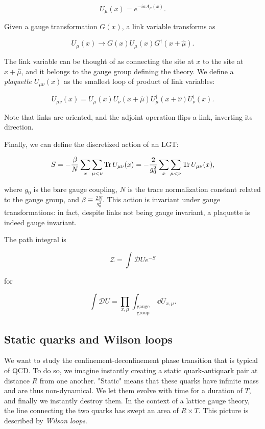 \documentclass[reqno,12pt]{article}
\numberwithin{equation}{section}
\begin{document}
\begin{equation}
	U_\mu(x) = e^{-ia A_\mu(x)}.	
\end{equation}

Given a gauge transformation $G(x)$, a link variable transforms as

\begin{equation}
	U_\mu(x) \longrightarrow G(x) U_\mu(x) G^\dagger(x+\hat{\mu}).
\end{equation}

The link variable can be thought of as connecting the site at $x$ to the site at $x + \hat{\mu}$, and it belongs to the gauge
group defining the theory. We define a \textit{plaquette} $U_{\mu\nu}(x)$ as the smallest loop of product of link variables:

\begin{equation}
	U_{\mu\nu}(x) = U_\mu(x) U_\nu(x+\hat{\mu}) U^\dagger_\mu(x+\hat{\nu}) U^\dagger_\nu(x).
\end{equation}

Note that links are oriented, and the adjoint operation flips a link, inverting its direction.  

Finally, we can define the discretized action of an LGT:

\begin{equation} \label{eq:lgt_action}
	S = -\frac{\beta}{N} \sum_x \sum_{\mu < \nu} \Tr U_{\mu\nu}(x) = -\frac{2}{g_0^2} \sum_x \sum_{\mu < \nu} \Tr U_{\mu\nu}(x),
\end{equation}

where $g_0$ is the bare gauge coupling, $N$ is the trace normalization constant related to the gauge group, and
$\beta \equiv \frac{2N}{g_0^2}$. This action is invariant under gauge transformations: in fact, despite
links not being gauge invariant, a plaquette is indeed gauge invariant.

The path integral is

\begin{equation}
	\mathcal{Z} = \int \mathcal{D}U e^{-S}
\end{equation}

for 

\begin{equation}
	\int \mathcal{D}U = \prod_{x, \mu} \int_{\substack{\text{gauge} \\ \text{group}}} \dd{U_{x, \mu}}. 
\end{equation}

\subsection{Static quarks and Wilson loops}
We want to study the confinement-deconfinement phase transition that is typical of QCD. To do so, we imagine instantly
creating a static quark-antiquark pair at distance $R$ from one another. "Static" means that these quarks have infinite
mass and are thus non-dynamical. We let them evolve with time for a duration of $T$, 
and finally we instantly destroy them. In the context of a lattice gauge theory, the line connecting the two quarks has swept an area
of $R \times T$. This picture is described by \textit{Wilson loops}. 
\end{document}
